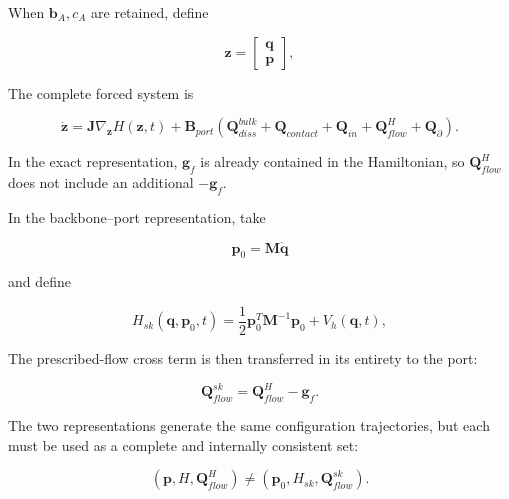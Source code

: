 When \(\mathbf{b}_{A},c_{A}\) are retained, define\cite{MarsdenRatiu1999MechanicsSymmetry,Arnold1989ClassicalMechanics}

\begin{equation}
\label{eq:hamiltonian-3-53}
\mathbf{z} = \begin{bmatrix}
\mathbf{q} \\
\mathbf{p}
\end{bmatrix},
\end{equation}

The complete forced system is

\begin{equation}
\label{eq:hamiltonian-3-54}
\boxed{\dot{\mathbf{z}} = \mathbf{J}\nabla_{\mathbf{z}}H\left( \mathbf{z},t \right) + \mathbf{B}_{port}\left( \mathbf{Q}_{diss}^{bulk} + \mathbf{Q}_{contact} + \mathbf{Q}_{in} + \mathbf{Q}_{flow}^{H} + \mathbf{Q}_{\partial} \right).}
\end{equation}

In the exact representation, \(\mathbf{g}_{f}\) is already contained in the Hamiltonian, so \(\mathbf{Q}_{flow}^{H}\) does not include an additional \(- \mathbf{g}_{f}\).

In the backbone--port representation, take

\begin{equation}
\label{eq:hamiltonian-3-55}
\mathbf{p}_{0} = \mathbf{M}\dot{\mathbf{q}}
\end{equation}

and define

\begin{equation}
\label{eq:hamiltonian-3-56}
H_{sk}\left( \mathbf{q},\mathbf{p}_{0},t \right) = \frac{1}{2}\mathbf{p}_{0}^{T}\mathbf{M}^{- 1}\mathbf{p}_{0} + V_{h}\left( \mathbf{q},t \right),
\end{equation}

The prescribed-flow cross term is then transferred in its entirety to the port:

\begin{equation}
\label{eq:hamiltonian-3-57}
\boxed{\mathbf{Q}_{flow}^{sk} = \mathbf{Q}_{flow}^{H} - \mathbf{g}_{f}.}
\end{equation}

The two representations generate the same configuration trajectories, but each must be used as a complete and internally consistent set:

\begin{equation}
\label{eq:hamiltonian-3-58}
\boxed{\left( \mathbf{p},H,\mathbf{Q}_{flow}^{H} \right) \neq \left( \mathbf{p}_{0},H_{sk},\mathbf{Q}_{flow}^{sk} \right).}
\end{equation}


